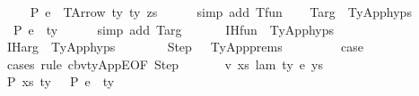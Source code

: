 \begin{isabellebody}
\ \ \isamarkupfalse%
\ {\isachardoublequoteopen}{\isasymGamma}\ {\isasymturnstile}{\isacharbraceleft}{\kern0pt}P{\isacharbraceright}{\kern0pt}\ e{}\ {\isacharcolon}{\kern0pt}\ TArrow\ ty{}\ ty{}\ zs{\isachardoublequoteclose}\isanewline
\ \ \ \ \isamarkupfalse%
\ {\isacharparenleft}{\kern0pt}simp\ add{\isacharcolon}{\kern0pt}\ T{\isacharunderscore}{\kern0pt}fun{\isacharparenright}{\kern0pt}\isanewline
\isanewline
\ \ \isamarkupfalse%
\ T{\isacharunderscore}{\kern0pt}arg\ {\isacharequal}{\kern0pt}\ TyApp{\isachardot}{\kern0pt}hyps{\isacharparenleft}{\kern0pt}{}{\isacharparenright}{\kern0pt}\ \ \ \isanewline
\ \ \isamarkupfalse%
\ {\isachardoublequoteopen}{\isasymGamma}\ {\isasymturnstile}{\isacharbraceleft}{\kern0pt}P{\isacharbraceright}{\kern0pt}\ e{}\ {\isacharcolon}{\kern0pt}\ ty{}{\isachardoublequoteclose}\isanewline
\ \ \ \ \isamarkupfalse%
\ {\isacharparenleft}{\kern0pt}simp\ add{\isacharcolon}{\kern0pt}\ T{\isacharunderscore}{\kern0pt}arg{\isacharparenright}{\kern0pt}\isanewline
\isanewline
\ \ \isanewline
\ \ \isamarkupfalse%
\ IH{\isacharunderscore}{\kern0pt}fun\ {\isacharequal}{\kern0pt}\ TyApp{\isachardot}{\kern0pt}hyps{\isacharparenleft}{\kern0pt}{}{\isacharparenright}{\kern0pt}\ \ \ \ \isanewline
\ \ \isamarkupfalse%
\ IH{\isacharunderscore}{\kern0pt}arg\ {\isacharequal}{\kern0pt}\ TyApp{\isachardot}{\kern0pt}hyps{\isacharparenleft}{\kern0pt}{}{\isacharparenright}{\kern0pt}\ \ \ \ \isanewline
\ \ \isamarkupfalse%
\ Step\ \ {\isacharequal}{\kern0pt}\ TyApp{\isachardot}{\kern0pt}prems\ \ \ \ \ \isanewline
\isanewline
\ \ \isamarkupfalse%
\ {\isacharquery}{\kern0pt}case\isanewline
\ \ \isamarkupfalse%
\ {\isacharparenleft}{\kern0pt}cases\ rule{\isacharcolon}{\kern0pt}\ cbv{\isacharunderscore}{\kern0pt}ty{\isacharunderscore}{\kern0pt}AppE{\isacharbrackleft}{\kern0pt}OF\ Step{\isacharbrackright}{\kern0pt}{\isacharparenright}{\kern0pt}\isanewline
\ \ \ \ \isamarkupfalse%
\ {\isacharparenleft}{\kern0pt}{}\ v\ xs\ lam\ ty\ e\ ys{\isacharparenright}{\kern0pt}\isanewline
\isanewline
\ \ \ \ \isamarkupfalse%
\ P{}{\isacharcolon}{\kern0pt}\ {\isachardoublequoteopen}{\isacharparenleft}{\kern0pt}xs{\isacharcomma}{\kern0pt}\ ty{}{\isacharparenright}{\kern0pt}\ {\isacharhash}{\kern0pt}\ {\isasymGamma}\ {\isasymturnstile}{\isacharbraceleft}{\kern0pt}P{\isacharbraceright}{\kern0pt}\ e\ {\isacharcolon}{\kern0pt}\ ty{}\ {\isacharequal}{\kern0pt}{\isacharequal}{\kern0pt}{\isachargreater}{\kern0pt}\isanewline

\end{isabellebody}
